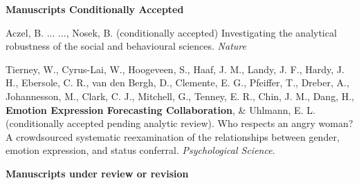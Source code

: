 
{\large \textbf{Manuscripts Conditionally Accepted}}
\begin{etaremune}
\item Aczel, B. ... \meb..., Nosek, B. (conditionally accepted) Investigating the analytical robustness of the social and behavioural sciences. \textit{Nature}
\item Tierney, W., Cyrus-Lai, W., Hoogeveen, S., Haaf, J. M., Landy, J. F., Hardy, J. H., Ebersole, C. R., van den Bergh, D., Clemente, E. G., Pfeiffer, T., Dreber, A., Johannesson, M., Clark, C. J., Mitchell, G., Tenney, E. R., Chin, J. M., Dang, H., \textbf{Emotion Expression Forecasting Collaboration}, \& Uhlmann, E. L. (conditionally accepted pending analytic review). Who respects an angry woman? A crowdsourced systematic reexamination of the relationships between gender, emotion expression, and status conferral. \textit{Psychological Science}.
\end{etaremune}
{\large \textbf{Manuscripts under review or revision}}
